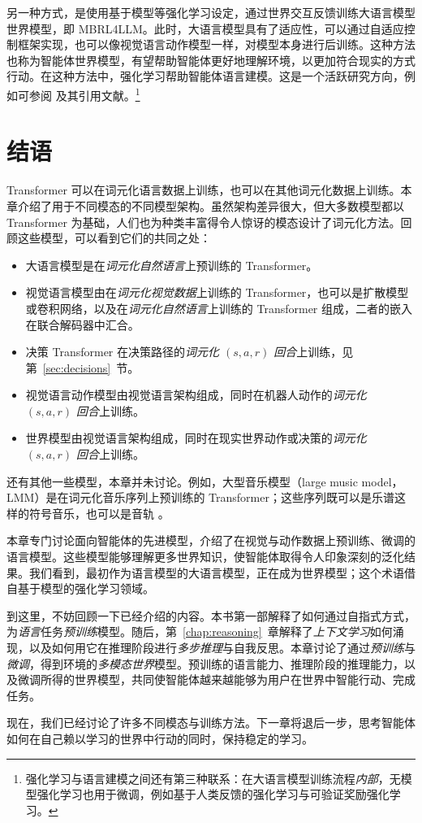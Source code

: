 另一种方式，是使用基于模型等强化学习设定，通过世界交互反馈训练大语言模型世界模型，即 MBRL4LLM。此时，大语言模型具有了适应性，可以通过自适应控制框架实现，也可以像视觉语言动作模型一样，对模型本身进行后训练。这种方法也称为智能体世界模型，有望帮助智能体更好地理解环境，以更加符合现实的方式行动。在这种方法中，强化学习帮助智能体语言建模。这是一个活跃研究方向，例如可参阅 \citet{zuo2026qwen} 及其引用文献。\footnote{强化学习与语言建模之间还有第三种联系：在大语言模型训练流程{\em 内部}，无模型强化学习也用于微调，例如基于人类反馈的强化学习与可验证奖励强化学习。}

\section{结语}

Transformer 可以在词元化语言数据上训练，也可以在其他词元化数据上训练。本章介绍了用于不同模态的不同模型架构。虽然架构差异很大，但大多数模型都以 Transformer 为基础，人们也为种类丰富得令人惊讶的模态设计了词元化方法。回顾这些模型，可以看到它们的共同之处：
\begin{itemize}
    \item 大语言模型是在{\em 词元化自然语言}上预训练的 Transformer。
    \item 视觉语言模型由在{\em 词元化视觉数据}上训练的 Transformer，也可以是扩散模型或卷积网络，以及在{\em 词元化自然语言}上训练的 Transformer 组成，二者的嵌入在联合解码器中汇合。
    \item 决策 Transformer 在决策路径的{\em 词元化 $(s,a,r)$ 回合}上训练，见第~\ref{sec:decisions}~节。
    \item 视觉语言动作模型由视觉语言架构组成，同时在机器人动作的{\em 词元化 $(s,a,r)$ 回合}上训练。
    \item 世界模型由视觉语言架构组成，同时在现实世界动作或决策的{\em 词元化 $(s,a,r)$ 回合}上训练。
\end{itemize}
还有其他一些模型，本章并未讨论。例如，大型音乐模型（large music model，LMM）是在词元化音乐序列上预训练的 Transformer；这些序列既可以是乐谱这样的符号音乐，也可以是音轨 \citep{yuan2025yue}。

本章专门讨论面向智能体的先进模型，介绍了在视觉与动作数据上预训练、微调的语言模型。这些模型能够理解更多世界知识，使智能体取得令人印象深刻的泛化结果。我们看到，最初作为语言模型的大语言模型，正在成为世界模型；这个术语借自基于模型的强化学习领域。

到这里，不妨回顾一下已经介绍的内容。本书第一部解释了如何通过自指式方式，为{\em 语言}任务{\em 预训练}模型。随后，第~\ref{chap:reasoning}~章解释了{\em 上下文学习}如何涌现，以及如何用它在推理阶段进行{\em 多步推理}与自我反思。本章讨论了通过{\em 预训练}与{\em 微调}，得到环境的{\em 多模态世界}模型。预训练的语言能力、推理阶段的推理能力，以及微调所得的世界模型，共同使智能体越来越能够为用户在世界中智能行动、完成任务。

现在，我们已经讨论了许多不同模态与训练方法。下一章将退后一步，思考智能体如何在自己赖以学习的世界中行动的同时，保持稳定的学习。




